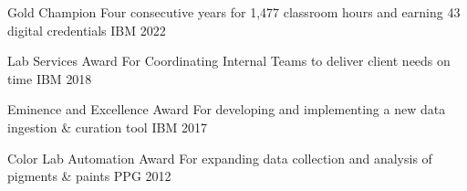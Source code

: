 

\begin{cvhonors}

  \cvhonor
    {Gold Champion} %
    {Four consecutive years for 1,477 classroom hours and earning 43 digital credentials} %
    {IBM} %
    {2022} %

  \cvhonor
    {Lab Services Award} %
    {For Coordinating Internal Teams to deliver client needs on time} %
    {IBM} %
    {2018} %

  \cvhonor
    {Eminence and Excellence Award} %
    {For developing and implementing a new data ingestion \& curation tool} %
    {IBM} %
    {2017} %

  \cvhonor
    {Color Lab Automation Award} %
    {For expanding data collection and analysis of pigments \& paints}
    {PPG} %
    {2012} %

\end{cvhonors}
